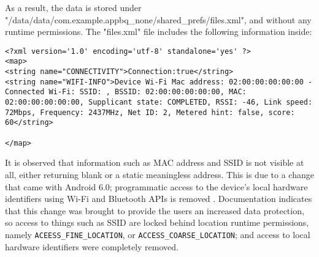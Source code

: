 \documentclass[
  a4paper,  %
  twoside,  %
  bibliography=totoc,
  headsepline,
  cleardoublepage=empty,
  parskip=half,
  draft=false,
  open=any
]{scrbook}
\begin{document}
As a result, the data is stored under "/data/data/com.example.appbq\_none/shared\_prefs/files.xml", and without any runtime permissions. The "files.xml" file includes the following information inside:
\begin{lstlisting}
<?xml version='1.0' encoding='utf-8' standalone='yes' ?>
<map>
<string name="CONNECTIVITY">Connection:true</string>
<string name="WIFI-INFO">Device Wi-Fi Mac address: 02:00:00:00:00:00 - Connected Wi-Fi: SSID: , BSSID: 02:00:00:00:00:00, MAC: 02:00:00:00:00:00, Supplicant state: COMPLETED, RSSI: -46, Link speed: 72Mbps, Frequency: 2437MHz, Net ID: 2, Metered hint: false, score: 60</string>

</map>
\end{lstlisting}

It is observed that information such as MAC address and SSID is not visible at all, either returning blank or a static meaningless address. This is due to a change that came with Android 6.0; programmatic access to the device's local hardware identifiers using Wi-Fi and Bluetooth APIs is removed \cite{changes60}. Documentation indicates that this change was brought to provide the users an increased data protection, so access to things such as SSID are locked behind location runtime permissions, namely \texttt{ACEESS\_FINE\_LOCATION}, or \texttt{ACCESS\_COARSE\_LOCATION}; and access to local hardware identifiers were completely removed. 
\end{document}
